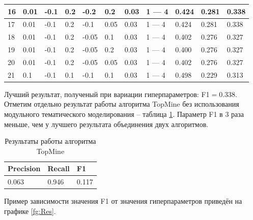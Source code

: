 \documentclass[a4paper, 12pt]{article}
\begin{document}
\begin{table}[!ht]
\begin{tabular}{|l|l|l|l|l|l|l|p{50 pt}|l|l|l|}
        \rowcolor{Gray}
        16 & 0.01 & -0.1 & 0.2 & -0.2 & 0.2 & 0.03 & 1 — 4 & 0.424 & 0.281 & 0.338 \\ \hline
        \rowcolor{Gray}
        17 & 0.01 & -0.1 & 0.2 & -0.1 & 0.05 & 0.03 & 1 — 4 & 0.424 & 0.281 & 0.338 \\ \hline
        18 & 0.01 & -0.1 & 0.2 & -0.05 & 0.1 & 0.03 & 1 — 4 & 0.402 & 0.276 & 0.327 \\ \hline
        19 & 0.01 & -0.1 & 0.2 & -0.05 & 0.2 & 0.03 & 1 — 4 & 0.400 & 0.276 & 0.327 \\ \hline
        20 & 0.01 & -0.1 & 0.2 & -0.05 & 0.05 & 0.03 & 1 — 4 & 0.402 & 0.276 & 0.327 \\ \hline
        21 & 0.1 & -0.1 & 0.1 & -0.1 & 0.1 & 0.03 & 1 — 4 & 0.498 & 0.229 & 0.313 \\
        \hline
    \end{tabular}
\end{table}

    Лучший результат, полученый при вариации гиперпараметров: F1$= 0.338$. Отметим отдельно результат работы алгоритма TopMine без использования модульного тематического моделирования -- таблица \ref{table:TopMine}. Параметр F1 в 3 раза меньше, чем у лучшего результата объединения двух алгоритмов.

    \begin{table}[!ht]
    \caption{Результаты работы алгоритма TopMine}
    \label{table:TopMine}
    \centering\medskip
    \begin{tabular}{|l|l|l|}
    \hline
        Precision & Recall & F1 \\ \hline
        0.063 & 0.946 & 0.117 \\
        \hline
    \end{tabular}
\end{table}

    Пример зависимости значения F1 от значения гиперпараметров приведён на графике \ref{fg:Res}.
\end{document}
